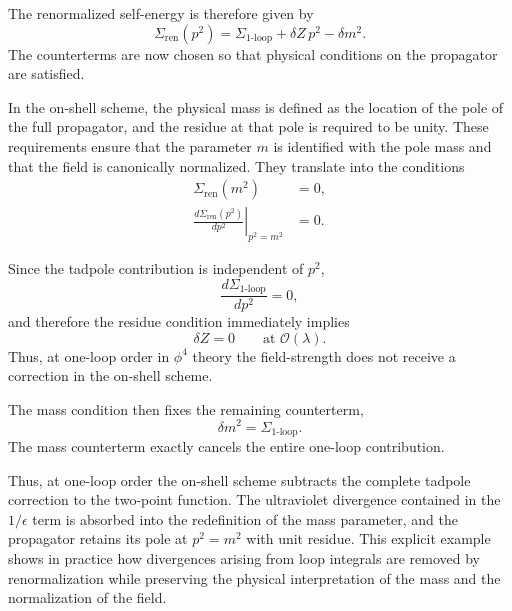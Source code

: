 The renormalized self-energy is therefore given by
\begin{equation}
\Sigma_{\text{ren}}(p^2)
=
\Sigma_{\text{1-loop}}
+
\delta Z\,p^2
-
\delta m^2.
\end{equation}
The counterterms are now chosen so that physical conditions on the
propagator are satisfied.

In the on-shell scheme, the physical mass is defined as the location
of the pole of the full propagator, and the residue at that pole is
required to be unity.
These requirements ensure that the parameter $m$ is identified with
the pole mass and that the field is canonically normalized.
They translate into the conditions
\begin{align}
\Sigma_{\text{ren}}(m^2) &= 0, \\
\left.\frac{d\Sigma_{\text{ren}}(p^2)}{dp^2}\right|_{p^2=m^2} &= 0.
\end{align}

Since the tadpole contribution is independent of $p^2$,
\begin{equation}
\frac{d\Sigma_{\text{1-loop}}}{dp^2}=0,
\end{equation}
and therefore the residue condition immediately implies
\begin{equation}
\delta Z = 0
\qquad \text{at } \mathcal{O}(\lambda).
\end{equation}
Thus, at one-loop order in $\phi^4$ theory the field-strength does
not receive a correction in the on-shell scheme.

The mass condition then fixes the remaining counterterm,
\begin{equation}
\delta m^2
=
\Sigma_{\text{1-loop}}.
\end{equation}
The mass counterterm exactly cancels the entire one-loop contribution.

Thus, at one-loop order the on-shell scheme subtracts the complete
tadpole correction to the two-point function.
The ultraviolet divergence contained in the $1/\epsilon$ term is
absorbed into the redefinition of the mass parameter,
and the propagator retains its pole at $p^2 = m^2$ with unit residue.
This explicit example shows in practice how divergences arising from
loop integrals are removed by renormalization while preserving the
physical interpretation of the mass and the normalization of the
field.
